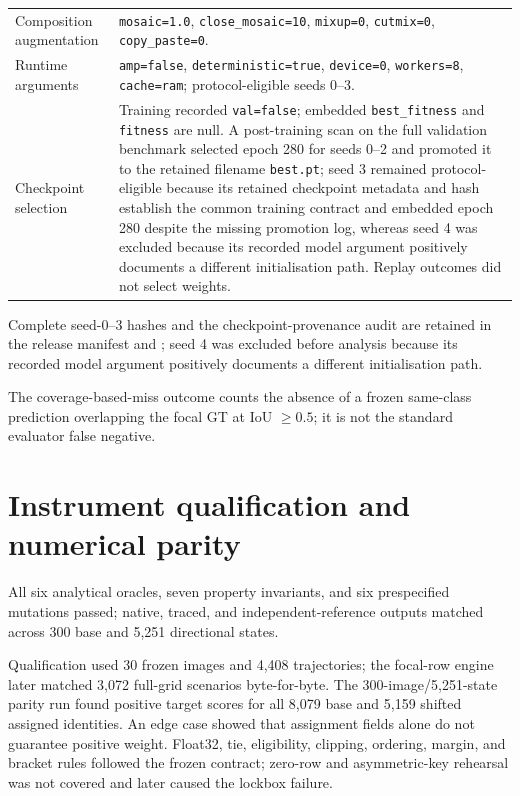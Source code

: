 \documentclass[preprint,10pt]{elsarticle}
\begin{document}
\begin{table}[ht]
\begin{tabularx}{\textwidth}{@{}p{}X@{}}
Composition augmentation & \texttt{mosaic=1.0}, \texttt{close\_mosaic=10}, \texttt{mixup=0}, \texttt{cutmix=0}, \texttt{copy\_paste=0}. \\
Runtime arguments & \texttt{amp=false}, \texttt{deterministic=true}, \texttt{device=0}, \texttt{workers=8}, \texttt{cache=ram}; protocol-eligible seeds 0--3. \\
Checkpoint selection & Training recorded \texttt{val=false}; embedded \texttt{best\_fitness} and \texttt{fitness} are null. A post-training scan on the full validation benchmark selected epoch 280 for seeds 0--2 and promoted it to the retained filename \texttt{best.pt}; seed 3 remained protocol-eligible because its retained checkpoint metadata and hash establish the common training contract and embedded epoch 280 despite the missing promotion log, whereas seed 4 was excluded because its recorded model argument positively documents a different initialisation path. Replay outcomes did not select weights. \\
\bottomrule
\end{tabularx}
\end{table}

Complete seed-0--3 hashes and the checkpoint-provenance audit are retained in the release manifest and ; seed 4 was excluded before analysis because its recorded model argument positively documents a different initialisation path.

The coverage-based-miss outcome counts the absence of a frozen same-class prediction overlapping the focal GT at IoU $\geq0.5$; it is not the standard evaluator false negative.

\section{Instrument qualification and numerical parity}

All six analytical oracles, seven property invariants, and six prespecified mutations passed; native, traced, and independent-reference outputs matched across 300 base and 5,251 directional states.

Qualification used 30 frozen images and 4,408 trajectories; the focal-row engine later matched 3,072 full-grid scenarios byte-for-byte. The 300-image/5,251-state parity run found positive target scores for all 8,079 base and 5,159 shifted assigned identities. An edge case showed that assignment fields alone do not guarantee positive weight. Float32, tie, eligibility, clipping, ordering, margin, and bracket rules followed the frozen contract; zero-row and asymmetric-key rehearsal was not covered and later caused the lockbox failure.
\end{document}
